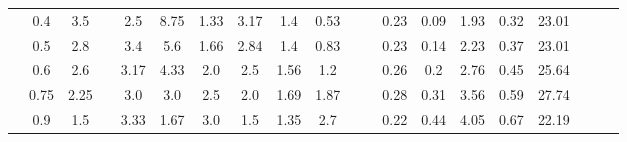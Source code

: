 \documentclass[a4paper,12pt]{article}
\begin{document}
\begin{table}[htbp]
\begin{tabular}{|c|c|c|c|c|c|c|c|c|c|c|c|c|c|c|c|c|c|c|c|}
			& 0.4        & 3.5        &                       & 2.5           & 8.75          & 1.33          & 3.17          & 1.4           & 0.53          &                       &                       & 0.23               & 0.09               & 1.93       & 0.32            & 23.01               &                       &                        &                      \\ \cline{2-3} \cline{5-10} \cline{13-17}
			& 0.5        & 2.8        &                       & 3.4           & 5.6           & 1.66          & 2.84          & 1.4           & 0.83          &                       &                       & 0.23               & 0.14               & 2.23       & 0.37            & 23.01               &                       &                        &                      \\ \cline{2-3} \cline{5-10} \cline{13-17}
			& 0.6        & 2.6        &                       & 3.17          & 4.33          & 2.0           & 2.5           & 1.56          & 1.2           &                       &                       & 0.26               & 0.2                & 2.76       & 0.45            & 25.64               &                       &                        &                      \\ \cline{2-3} \cline{5-10} \cline{13-17}
			& 0.75       & 2.25       &                       & 3.0           & 3.0           & 2.5           & 2.0           & 1.69          & 1.87          &                       &                       & 0.28               & 0.31               & 3.56       & 0.59            & 27.74               &                       &                        &                      \\ \cline{2-3} \cline{5-10} \cline{13-17}
			& 0.9        & 1.5        &                       & 3.33          & 1.67          & 3.0           & 1.5           & 1.35          & 2.7           &                       &                       & 0.22               & 0.44               & 4.05       & 0.67            & 22.19               &                       &                        &                      \\ \hline
		\end{tabular}%
	\end{table}
	
\end{document}
